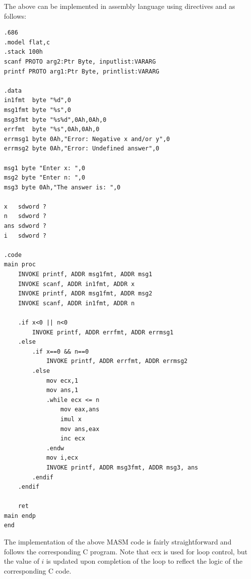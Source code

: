 \documentclass[10pt]{book}
\begin{document}
The above can be implemented in assembly language using directives and as follows:
\begin{verbatim}
.686
.model flat,c
.stack 100h
scanf PROTO arg2:Ptr Byte, inputlist:VARARG
printf PROTO arg1:Ptr Byte, printlist:VARARG

.data
in1fmt  byte "%d",0
msg1fmt byte "%s",0
msg3fmt byte "%s%d",0Ah,0Ah,0
errfmt  byte "%s",0Ah,0Ah,0
errmsg1 byte 0Ah,"Error: Negative x and/or y",0
errmsg2 byte 0Ah,"Error: Undefined answer",0

msg1 byte "Enter x: ",0
msg2 byte "Enter n: ",0
msg3 byte 0Ah,"The answer is: ",0

x   sdword ?
n   sdword ?
ans sdword ?
i   sdword ?

.code
main proc
    INVOKE printf, ADDR msg1fmt, ADDR msg1
    INVOKE scanf, ADDR in1fmt, ADDR x
    INVOKE printf, ADDR msg1fmt, ADDR msg2
    INVOKE scanf, ADDR in1fmt, ADDR n

    .if x<0 || n<0
        INVOKE printf, ADDR errfmt, ADDR errmsg1
    .else
        .if x==0 && n==0
            INVOKE printf, ADDR errfmt, ADDR errmsg2
        .else
            mov ecx,1
            mov ans,1
            .while ecx <= n
                mov eax,ans
                imul x
                mov ans,eax
                inc ecx
            .endw
            mov i,ecx
            INVOKE printf, ADDR msg3fmt, ADDR msg3, ans
        .endif
    .endif

    ret
main endp
end
\end{verbatim}

The implementation of the above MASM code is fairly straightforward and follows the corresponding C program. Note that ecx is used for loop control, but the value of $i$ is updated upon completion of the loop to reflect the logic of the corresponding C code.
\end{document}
